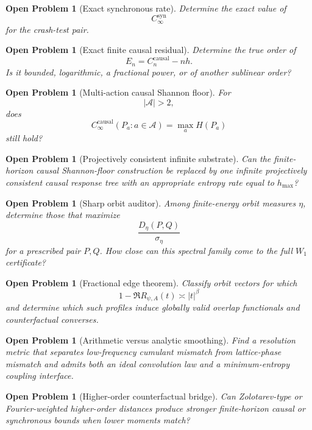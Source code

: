 \documentclass[11pt,a4paper]{article}
\newtheorem{problem}[theorem]{Open Problem}
\newcommand{\Ccausal}{C^{\mathrm{causal}}}
\newcommand{\CinfSyn}{C_{\infty}^{\mathrm{syn}}}
\newcommand{\CinfCausal}{C_{\infty}^{\mathrm{causal}}}
\newcommand{\cA}{\mathcal A}
\newcommand{\1}{\mathbf 1}
\begin{document}
\begin{problem}[Exact synchronous rate]
Determine the exact value of
\[
\CinfSyn
\]
for the crash-test pair.
\end{problem}

\begin{problem}[Exact finite causal residual]
Determine the true order of
\[
E_n=\Ccausal_n-nh.
\]
Is it bounded, logarithmic, a fractional power, or of another sublinear
order?
\end{problem}

\begin{problem}[Multi-action causal Shannon floor]
For
\[
|\cA|>2,
\]
does
\[
\CinfCausal(P_a:a\in\cA)
=
\max_aH(P_a)
\]
still hold?
\end{problem}

\begin{problem}[Projectively consistent infinite substrate]
Can the finite-horizon causal Shannon-floor construction be replaced by
one infinite projectively consistent causal response tree with an
appropriate entropy rate equal to \(h_{\max}\)?
\end{problem}

\begin{problem}[Sharp orbit auditor]
Among finite-energy orbit measures \(\eta\), determine those that maximize
\[
\frac{D_\eta(P,Q)}{\sigma_\eta}
\]
for a prescribed pair \(P,Q\).
How close can this spectral family come to the full \(W_1\) certificate?
\end{problem}

\begin{problem}[Fractional edge theorem]
Classify orbit vectors for which
\[
1-\Re R_{\psi,A}(t)
\asymp|t|^\beta
\]
and determine which such profiles induce globally valid overlap
functionals and counterfactual converses.
\end{problem}

\begin{problem}[Arithmetic versus analytic smoothing]
Find a resolution metric that separates low-frequency cumulant mismatch
from lattice-phase mismatch and admits both an ideal convolution law and
a minimum-entropy coupling interface.
\end{problem}

\begin{problem}[Higher-order counterfactual bridge]
Can Zolotarev-type or Fourier-weighted higher-order distances produce
stronger finite-horizon causal or synchronous bounds when lower moments
match?
\end{problem}
\end{document}

